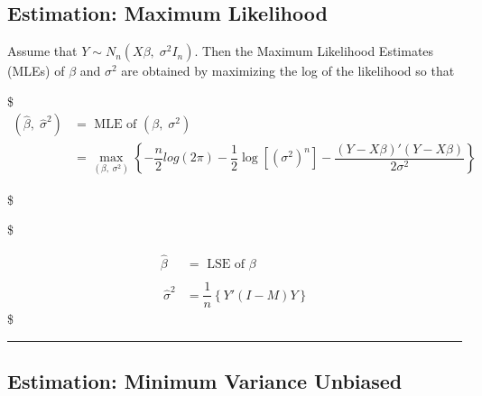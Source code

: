 \documentclass[
]{book}
\begin{document}
{{{\hypertarget{estimation-maximum-likelihood}{%
\subsection{Estimation: Maximum Likelihood}\label{estimation-maximum-likelihood}}

Assume that \(Y \sim N_n(X\beta , \; \sigma^2 I_n)\). Then the Maximum Likelihood Estimates (MLEs) of \(\beta\) and \(\sigma^2\) are obtained by maximizing the log of the likelihood so that

\$
\begin{align}

\left( 

\hat \beta , \; \hat \sigma^2


\right)

&= \text{ MLE of }

\left( 

\beta , \; \sigma^2


\right)


\\

&=

\max_{\left( \beta , \; \sigma^2 \right)} \left\{ 

-\dfrac{n}{2}log(2 \pi) - \dfrac{1}{2} \log \left[ (\sigma^2 )^n\right] - \dfrac{(Y-X\beta)'(Y-X\beta)}{2\sigma^2}




\right\}


\end{align}

\$

\$

\begin{align}

\hat \beta &= \text{ LSE of } \beta \\

\\\

\hat \sigma^2 &= \dfrac{1}{n} \left\{Y'(I-M)Y \right\}


\end{align}
\$

\begin{center}\rule{0.5\linewidth}{0.5pt}\end{center}

\hypertarget{estimation-minimum-variance-unbiased}{%
\subsection{Estimation: Minimum Variance Unbiased}\label{estimation-minimum-variance-unbiased}}

}}}
\end{document}
